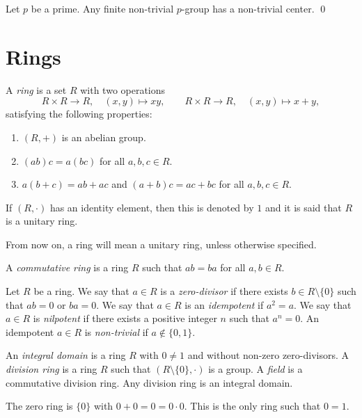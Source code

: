 \begin{theorem}
    Let $p$ be a prime. Any finite non-trivial $p$-group has a non-trivial center. \qed
\end{theorem}


\section{Rings}

A {\em ring} is a set $R$ with two operations
\[
R\times R\rightarrow R,
\quad
(x,y)\mapsto xy,
\qquad
R\times R\rightarrow R,
\quad
(x,y)\mapsto x+y,
\]
satisfying the following properties:
\begin{enumerate}
	\item $(R,+)$ is an abelian group.
	\item $(ab)c=a(bc)$ for all $a,b,c\in R$.
    \item $a(b+c)=ab+ac$ and $(a+b)c=ac+bc$ for all $a,b,c\in R$.
\end{enumerate}
If $(R,\cdot)$ has an identity element, then this is denoted by $1$ 
and it is said that $R$ is a unitary ring. 

\begin{convention}
    From now on, a ring will mean a unitary ring, unless otherwise specified. 
\end{convention}

A {\em commutative ring} is a ring $R$ such that
$ab=ba$ for all $a,b\in R$.

Let $R$ be a ring. We say that $a\in R$ is a {\em zero-divisor} if there exists $b\in R\setminus\{0\}$ 
such that $ab=0$ or $ba=0$. We say that $a\in R$ is an {\em idempotent} if $a^2=a$. 
We say that $a\in R$ is {\em nilpotent} if there exists a positive integer $n$ such that $a^n=0$.  
An idempotent $a\in R$ is {\em non-trivial} if $a\not\in\{0,1\}$.

An {\em integral domain} is a ring $R$ with $0\neq 1$ and without non-zero zero-divisors.
A {\em division ring} is a ring $R$ such that $(R\setminus \{0\},\cdot)$ is a group. 
A {\em field} is a commutative division ring. Any division ring is an integral domain.

\begin{example} 
    The zero ring is $\{0\}$ with $0+0=0=0\cdot 0$. This is the only ring such that $0=1$.
\end{example}

